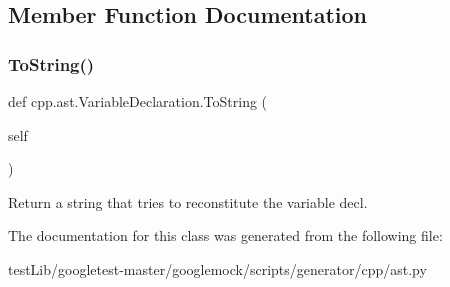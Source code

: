 \subsection{Member Function Documentation}
\mbox{\label{classcpp_1_1ast_1_1VariableDeclaration_a047aa4afddf7b7823a4095cea9477a21}} 
\subsubsection{\texorpdfstring{To\+String()}{ToString()}}
{\footnotesize\ttfamily def cpp.\+ast.\+Variable\+Declaration.\+To\+String (\begin{DoxyParamCaption}\item[{}]{self }\end{DoxyParamCaption})}

\begin{DoxyVerb}Return a string that tries to reconstitute the variable decl.\end{DoxyVerb}
 

The documentation for this class was generated from the following file\+:\begin{DoxyCompactItemize}
\item 
test\+Lib/googletest-\/master/googlemock/scripts/generator/cpp/ast.\+py\end{DoxyCompactItemize}
